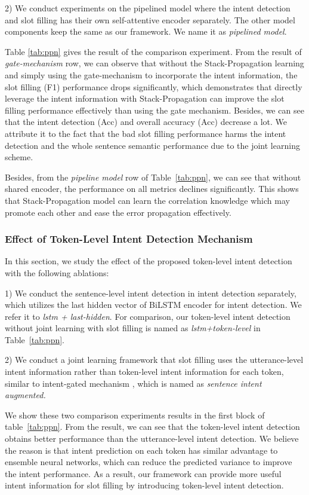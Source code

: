 \documentclass[11pt,a4paper]{article}
\begin{document}
2) We conduct experiments on the pipelined model where the intent detection and slot filling has their own self-attentive encoder separately. The other model components keep the same as our framework.
We name it as \textit{pipelined model}.

Table \ref{tab:ppn} 
gives the result of the comparison experiment.
From the result of \textit{gate-mechanism} row, we can observe that 
without the Stack-Propagation learning and simply using the gate-mechanism to incorporate the intent information,
the slot filling (F1) performance drops 
significantly, which demonstrates that directly 
leverage the intent information with Stack-Propagation can improve the slot filling performance effectively than using the gate mechanism.
Besides, we can see that the intent detection (Acc) and overall accuracy (Acc) decrease a lot.
We attribute it to the fact 
that the bad slot filling performance harms 
the intent detection and the whole sentence 
semantic performance due to the joint learning scheme.

Besides, from the \textit{pipeline model} row of Table~\ref{tab:ppn},
we can see that without shared encoder, the performance on all metrics 
declines significantly. 
This shows that Stack-Propagation model can learn the correlation knowledge which may promote each other and ease the error propagation effectively.

\subsubsection{Effect of Token-Level Intent Detection Mechanism}
In this section, we study the effect of the proposed token-level intent 
detection with the following ablations:

1) We conduct the sentence-level intent detection 
in intent detection separately, which utilizes the last hidden vector of BiLSTM 
encoder for intent detection. We refer it to \textit{lstm + last-hidden}.
For comparison, our token-level intent detection without joint learning with slot filling is named as \textit{lstm+token-level} in Table~\ref{tab:ppn}.

2) We conduct a joint learning framework that slot filling uses the
utterance-level intent information rather than token-level intent information for each token, similar to intent-gated 
mechanism \cite{li2018self}, which is named as \textit{sentence intent augmented.}

We show these two comparison experiments results in the first block of 
table~\ref{tab:ppn}. From the result, we can see that the 
token-level intent detection obtains better performance than the 
utterance-level intent detection. We believe the reason is that intent prediction on each token has similar advantage to ensemble neural networks, which can reduce the predicted variance to improve the intent performance. 
As a result, our framework can provide more useful intent information for slot filling by introducing token-level intent detection.
\end{document}
